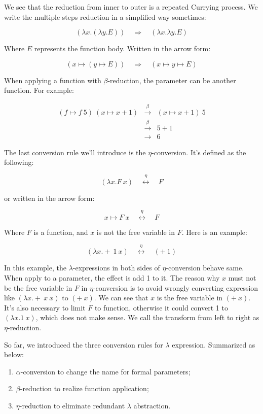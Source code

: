 \documentclass{article}
\begin{document}
We see that the reduction from inner to outer is a repeated Currying process. We write the multiple steps reduction in a simplified way sometimes:

\[
(\lambda x . (\lambda y . E)) \quad \Rightarrow \quad (\lambda x . \lambda y . E)
\]

Where $E$ represents the function body. Written in the arrow form:

\[
(x \mapsto (y \mapsto E)) \quad \Rightarrow \quad (x \mapsto y \mapsto E)
\]

When applying a function with $\beta$-reduction, the parameter can be another function. For example:

\[
\begin{array}{rcl}
(f \mapsto f\ 5)\ (x \mapsto x + 1) & \overset{\beta}{\longrightarrow} & (x \mapsto x + 1)\ 5 \\
                                    & \overset{\beta}{\longrightarrow} & 5 + 1 \\
                                    & \longrightarrow & 6
\end{array}
\]

The last conversion rule we'll introduce is the $\eta$-conversion. It's defined as the following:

\[
(\lambda x . F\ x) \quad \overset{\eta}{\longleftrightarrow} \quad F
\]

or written in the arrow form:

\[
x \mapsto F\ x \quad \overset{\eta}{\longleftrightarrow} \quad F
\]

Where $F$ is a function, and $x$ is not the free variable in $F$. Here is an example:

\[
(\lambda x . +\ 1\ x) \quad \overset{\eta}{\longleftrightarrow} \quad (+\ 1)
\]

In this example, the $\lambda$-expressions in both sides of $\eta$-conversion behave same. When apply to a parameter, the effect is add 1 to it. The reason why $x$ must not be the free variable in $F$ in $\eta$-conversion is to avoid wrongly converting expression like $(\lambda x. +\ x\ x)$ to $(+\ x)$. We can see that $x$ is the free variable in $(+\ x)$. It's also necessary to limit $F$ to function, otherwise it could convert 1 to $(\lambda x . 1\ x)$, which does not make sense. We call the transform from left to right as $\eta$-reduction.

So far, we introduced the three conversion rules for $\lambda$ expression. Summarized as below:

\begin{enumerate}
\item $\alpha$-conversion to change the name for formal parameters;
\item $\beta$-reduction to realize function application;
\item $\eta$-reduction to eliminate redundant $\lambda$ abstraction.
\end{enumerate}
\end{document}
